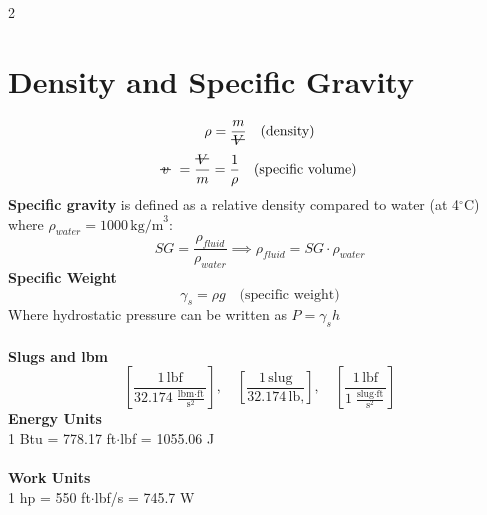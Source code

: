 \documentclass[10pt, fleqn]{article}
\newcommand{\vol}{\mathord{\text{\ooalign{\hidewidth $V$\hidewidth\cr\kern-0.5pt\raisebox{0.8ex}{\rule[0pt]{1em}{0.5pt}}}}}}
\newcommand{\svol}[1][-0.15em]{%
  \mathord{\text{\ooalign{
    $v$\cr
    \hspace{#1}\rule[0.6ex]{0.8em}{0.5pt} %
  }}}%
}
\begin{document}
\begin{multicols}{2}
\section*{Density and Specific Gravity}
\[\rho = \frac{m}{\vol}\quad \text{(density)}\]
\[\svol = \frac{\vol}{m} = \frac{1}{\rho} \quad \text{(specific volume)}\]
\textbf{Specific gravity} is defined as a relative density compared to water (at 4$^\circ$C) where $\rho_{water} = 1000\,\text{kg/m}^3$:
\[\boxed{SG = \frac{\rho_{fluid}}{\rho_{water}} \implies \rho_{fluid} = SG \cdot \rho_{water}}\]
\textbf{Specific Weight}
\[\gamma_s = \rho g \quad \text{(specific weight)}\]
Where hydrostatic pressure can be written as $P = \gamma_s h$\\\\
\textbf{Slugs and lbm}
\[\left[\frac{1\,\text{lbf}}{32.174\,\frac{\text{lbm}\cdot\text{ft}}{\text{s}^2}}\right],\quad
\left[\frac{1\,\text{slug}}{32.174\,\text{lb,}}\right], \quad
\left[\frac{1\,\text{lbf}}{1\,\frac{\text{slug}\cdot\text{ft}}{\text{s}^2}}\right]\]
\textbf{Energy Units}\\
1 Btu = 778.17 ft$\cdot$lbf = 1055.06 J\\\\
\textbf{Work Units}\\
1 hp = 550 ft$\cdot$lbf/s = 745.7 W
\end{multicols}\newpage
\makeatletter
\@fleqnfalse
\makeatother
\end{document}
